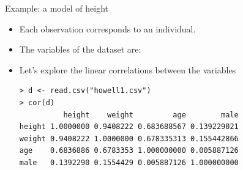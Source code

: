 \documentclass[handout]{beamer}
\begin{document}
\begin{frame}[fragile]{Example: a model of height}
\scriptsize{
\begin{itemize}
 \item Each observation corresponds to an individual.
 \item The variables of the dataset are:
 
\item Let's explore the linear correlations between the variables

 \begin{verbatim}
> d <- read.csv("howell1.csv")
> cor(d)
          height    weight         age        male
height 1.0000000 0.9408222 0.683688567 0.139229021
weight 0.9408222 1.0000000 0.678335313 0.155442866
age    0.6836886 0.6783353 1.000000000 0.005887126
male   0.1392290 0.1554429 0.005887126 1.000000000
 \end{verbatim}

 
 
 
\end{itemize}
 
 
 
 
} 
\end{frame}
\end{document}
